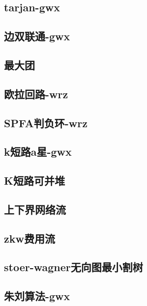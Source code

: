 \documentclass[titlepage,a4paper,10pt]{article}
\begin{document}
\begin{multicols}{2}
\begin{spacing}{0.8}
			\subsection{tarjan-gwx}
				
			\subsection{边双联通-gwx}
				
			\subsection{最大团}
				
			\subsection{欧拉回路-wrz}
				
			\subsection{SPFA判负环-wrz}
				
			\subsection{k短路a星-gwx}
				
			\subsection{K短路可并堆}
				
			\subsection{上下界网络流}
				
			\subsection{zkw费用流}
				
			\subsection{stoer-wagner无向图最小割树}
				
			\subsection{朱刘算法-gwx}
				

\end{spacing}
\end{multicols}
\end{document}
